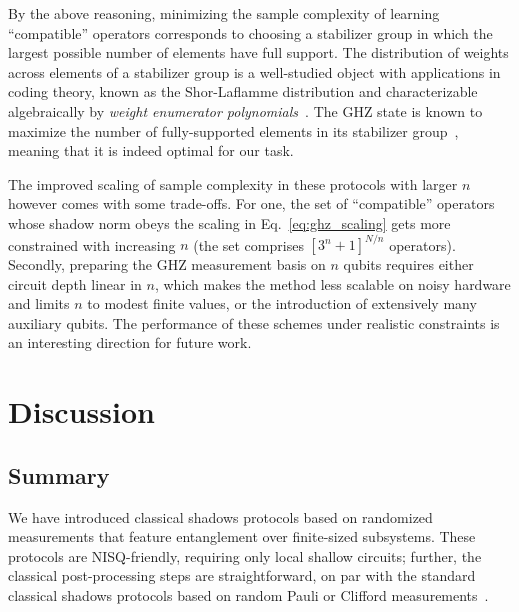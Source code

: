 \documentclass[a4paper,twocolumns,11pt,accepted=2024-03-04]{quantumarticle}
\begin{document}
By the above reasoning, minimizing the sample complexity of learning ``compatible'' operators corresponds to choosing a stabilizer group in which the largest possible number of elements have full support. The distribution of weights across elements of a stabilizer group is a well-studied object with applications in coding theory, known as the Shor-Laflamme distribution and characterizable algebraically by {\it weight enumerator polynomials}~\cite{shor_quantum_1997,cao_quantum_2023}. The GHZ state is known to maximize the number of fully-supported elements in its stabilizer group~\cite{miller_shor-laflamme_2023}, meaning that it is indeed optimal for our task. 

The improved scaling of sample complexity in these protocols with larger $n$ however comes with some trade-offs. 
For one, the set of ``compatible'' operators whose shadow norm obeys the scaling in Eq.~\eqref{eq:ghz_scaling} gets more constrained with increasing $n$ (the set comprises $[3^n+1]^{N/n}$ operators). 
Secondly, preparing the GHZ measurement basis on $n$ qubits requires either circuit depth linear in $n$, which makes the method less scalable on noisy hardware and limits $n$ to modest finite values, or the introduction of extensively many auxiliary qubits. The performance of these schemes under realistic constraints is an interesting direction for future work.


\section{Discussion}\label{sec:discussion}

\subsection{Summary}

We have introduced classical shadows protocols based on randomized measurements that feature entanglement over finite-sized subsystems. These protocols are NISQ-friendly, requiring only local shallow circuits; further, the classical post-processing steps are straightforward, on par with the standard classical shadows protocols based on random Pauli or Clifford measurements~\cite{huang_predicting_2020}.
\end{document}
